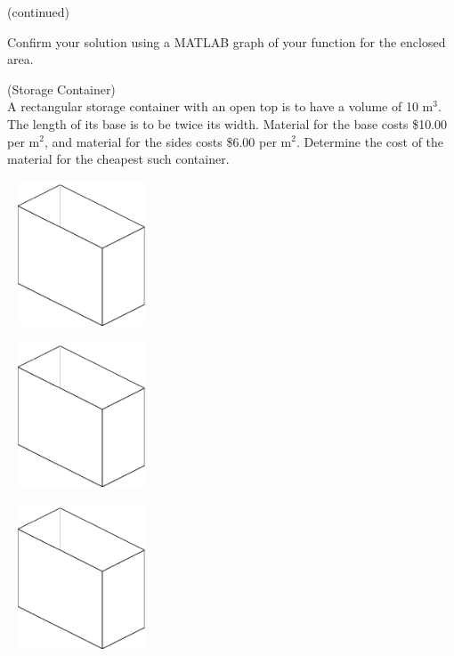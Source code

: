 \vspace{5cm}

\newpage

\hfill (continued)

\vfill

\problem Confirm your solution using a MATLAB graph of your function
for the enclosed area.  \vspace{1in}



\newpage

\problem (Storage Container)\\ A rectangular storage container with an
  open top is to have a volume of 10 m$^3$.  The length of its base is
  to be twice its width.  Material for the base costs \$10.00 per
  m$^2$, and material for the sides costs \$6.00 per m$^2$.  Determine
  the cost of the material for the cheapest such container.

~ \hfill \includegraphics[width=1.5in]{graphics/notes_03_storage_container}

\newpage
~ \hfill \includegraphics[width=1.5in]{graphics/notes_03_storage_container}

\newpage
~ \hfill \includegraphics[width=1.5in]{graphics/notes_03_storage_container}

